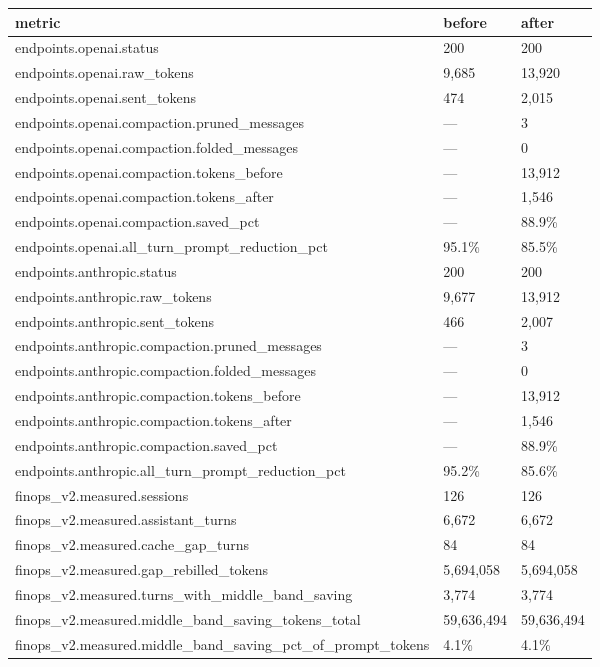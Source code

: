 \documentclass{article}
\begin{document}
\begin{table}[h]
\centering
\begin{tabular}{lll}
\toprule
metric & before & after \\
\midrule
endpoints.openai.status & 200 & 200 \\
endpoints.openai.raw\_tokens & 9,685 & 13,920 \\
endpoints.openai.sent\_tokens & 474 & 2,015 \\
endpoints.openai.compaction.pruned\_messages & — & 3 \\
endpoints.openai.compaction.folded\_messages & — & 0 \\
endpoints.openai.compaction.tokens\_before & — & 13,912 \\
endpoints.openai.compaction.tokens\_after & — & 1,546 \\
endpoints.openai.compaction.saved\_pct & — & 88.9\% \\
endpoints.openai.all\_turn\_prompt\_reduction\_pct & 95.1\% & 85.5\% \\
endpoints.anthropic.status & 200 & 200 \\
endpoints.anthropic.raw\_tokens & 9,677 & 13,912 \\
endpoints.anthropic.sent\_tokens & 466 & 2,007 \\
endpoints.anthropic.compaction.pruned\_messages & — & 3 \\
endpoints.anthropic.compaction.folded\_messages & — & 0 \\
endpoints.anthropic.compaction.tokens\_before & — & 13,912 \\
endpoints.anthropic.compaction.tokens\_after & — & 1,546 \\
endpoints.anthropic.compaction.saved\_pct & — & 88.9\% \\
endpoints.anthropic.all\_turn\_prompt\_reduction\_pct & 95.2\% & 85.6\% \\
finops\_v2.measured.sessions & 126 & 126 \\
finops\_v2.measured.assistant\_turns & 6,672 & 6,672 \\
finops\_v2.measured.cache\_gap\_turns & 84 & 84 \\
finops\_v2.measured.gap\_rebilled\_tokens & 5,694,058 & 5,694,058 \\
finops\_v2.measured.turns\_with\_middle\_band\_saving & 3,774 & 3,774 \\
finops\_v2.measured.middle\_band\_saving\_tokens\_total & 59,636,494 & 59,636,494 \\
finops\_v2.measured.middle\_band\_saving\_pct\_of\_prompt\_tokens & 4.1\% & 4.1\% \\

\end{tabular}
\end{table}
\end{document}

